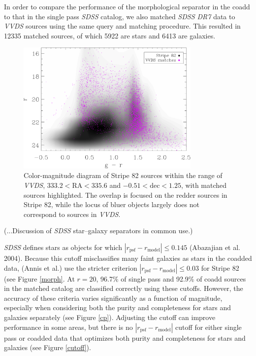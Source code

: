 \documentclass[12pt]{article}
\newcommand{\project}[1]{\textsl{#1}}
\begin{document}
In order to compare the performance of the morphological separator in the coadd to that in the single pass \project{SDSS} catalog, we also matched \project{SDSS DR7} data to \project{VVDS} sources using the same query and matching procedure. This resulted in 12335 matched sources, of which 5922 are stars and 6413 are galaxies.

\begin{figure}[h!]
	\includegraphics[width=0.8\textwidth]{final_figures/cmd.eps}
	\caption{Color-magnitude diagram of Stripe 82 sources within the range of \project{VVDS}, $333.2 < \mathrm{RA} < 335.6$ and $-0.51 < \mathrm{dec} < 1.25$, with matched sources highlighted. The overlap is focused on the redder sources in Stripe 82, while the locus of bluer objects largely does not correspond to sources in \project{VVDS}.}
	\label{cmd}
\end{figure}

(...Discussion of \project{SDSS} star--galaxy separators in common use.)

\project{SDSS} defines stars as objects for which $|r_{\mathrm{psf}} - r_{\mathrm{model}}| \leq 0.145$ (Abazajian et al. 2004). Because this cutoff misclassifies many faint galaxies as stars in the coadded data, (Annis et al.) use the stricter criterion $|r_{\mathrm{psf}} - r_{\mathrm{model}}| \leq 0.03$ for Stripe 82 (see Figure \ref{morph}. At $r = 20$, 96.7\% of single pass and 92.9\% of coadd sources in the matched catalog are classified correctly using these cutoffs. However, the accuracy of these criteria varies significantly as a function of magnitude, especially when considering both the purity and completeness for stars and galaxies separately (see Figure \ref{cp}). Adjusting the cutoff can improve performance in some areas, but there is no $|r_{\mathrm{psf}} - r_{\mathrm{model}}|$ cutoff for either single pass or coadded data that optimizes both purity and completeness for stars and galaxies (see Figure \ref{cutoff}).
\end{document}
